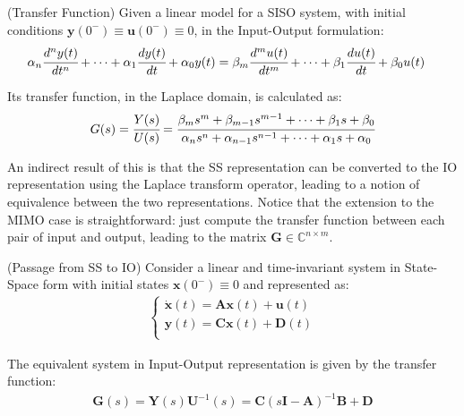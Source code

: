 \documentclass[a4paper,11pt]{book}
\numberwithin{figure}{chapter}
\numberwithin{equation}{chapter}
\numberwithin{table}{chapter}
\newtheorem{theorem}{Theorem}[chapter]
\theoremstyle{definition}
\newcounter{boxed-theorem}
\newenvironment{boxed-theorem}[1]
{\begin{shaded} \begin{theorem}{#1}}
{\end{theorem} \end{shaded}}
\newcounter{boxed-definition}
\begin{document}
\begin{boxed-theorem}{(Transfer Function)} \label{th:transFun01}
	Given a linear model for a SISO system, with initial conditions $\bm{y}(0^-) \equiv \bm{u}(0^-) \equiv 0$, in the Input-Output formulation:
	\begin{equation}
	\begin{split}
		\alpha_n \cfrac{d^n y(t)}{dt^n} + \cdots + \alpha_{1} \cfrac{d y(t)}{dt} + \alpha_{0} y(t) &= \beta_m \cfrac{d^m u(t)}{dt^m} + \cdots + \beta_{1} \cfrac{d u(t)}{dt} + \beta_{0} u(t)
	\end{split}
	\end{equation}
	
	\noindent Its transfer function, in the Laplace domain, is calculated as:
	\begin{equation} \label{eq:transFun01}
		 G(s) = \cfrac{Y(s)}{U(s)} = \cfrac{\beta_m s^m + \beta_{m-1} s^{m-1} + \cdots + \beta_{1} s + \beta_0}{\alpha_n s^n + \alpha_{n-1} s^{n-1} + \cdots + \alpha_{1} s + \alpha_0}
	\end{equation}
\end{boxed-theorem}

An indirect result of this is that the SS representation can be converted to the IO representation using the Laplace transform operator, leading to a notion of equivalence between the two representations. Notice that the extension to the MIMO case is straightforward: just compute the transfer function between each pair of input and output, leading to the matrix $\bm{G} \in \mathbb{C}^{n \times m}$.

\begin{boxed-theorem}{(Passage from SS to IO)} \label{th:SSToIO}
	Consider a linear and time-invariant system in State-Space form with initial states $\bm{x}(0^-) \equiv 0$ and represented as:
	\begin{align}
	\begin{cases}
		\dot{\bm{x}}(t) = \bm{A} \bm{x}(t) + \bm{u}(t) \\
		\bm{y}(t) = \bm{C} \bm{x}(t) + \bm{D}(t) \\
	\end{cases}		
	\end{align}
	
\noindent The equivalent system in Input-Output representation is given by the transfer function:
	\begin{align}
	\bm{G}(s) = \bm{Y}(s)\bm{U}^{-1}(s) = \bm{C} (s\bm{I} - \bm{A})^{-1} \bm{B} + \bm{D}
	\end{align}
\end{boxed-theorem}
 
\end{document}
